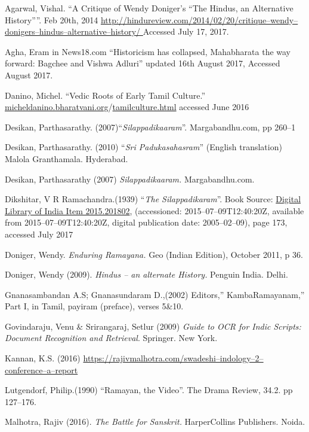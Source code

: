 \begin{thebibliography}{99}
 Agarwal, Vishal. “A Critique of Wendy Doniger’s “The Hindus, an Alternative History””. Feb 20th, 2014 \url{http://hindureview.com/2014/02/20/critique–wendy–donigers–hindus–alternative–history/ } Accessed July 17, 2017.

  Agha, Eram in News18.com “Historicism has collapsed, Mahabharata the way forward: Bagchee and Vishwa Adluri” updated 16th August 2017, Accessed August 2017.

  Danino, Michel. “Vedic Roots of Early Tamil Culture.” \url{micheldanino.bharatvani.org}/\url{tamilculture.html} accessed June 2016

  Desikan, Parthasarathy. (2007)“\textit{Silappadikaaram}”. Margabandhu.com, pp 260–1

  Desikan, Parthasarathy. (2010) “\textit{Sri Padukasahasram}” (English translation) Malola Granthamala. Hyderabad.

  Desikan, Parthasarathy (2007) \textit{Silappadikaaram.} Margabandhu.com.

  Dikshitar, V R Ramachandra.(1939) “\textit{The Silappadikaram}”. Book Source: \url{Digital Library of India Item 2015.201802}, (accessioned: 2015–07–09T12:40:20Z, available from 2015–07–09T12:40:20Z, digital publication date: 2005–02–09), page 173, accessed July 2017

  Doniger, Wendy. \textit{Enduring Ramayana.} Geo (Indian Edition), October 2011, p 36.

  Doniger, Wendy (2009). \textit{Hindus – an alternate History.} Penguin India. Delhi.

  Gnanasambandan A.S; Gnanasundaram D.,(2002) Editors,” KambaRamayanam,” Part I, in Tamil, payiram (preface), verses 5\&10.

  Govindaraju, Venu \& Srirangaraj, Setlur (2009) \textit{Guide to OCR for Indic Scripts:} \textit{Document Recognition and Retrieval}. Springer. New York.

  Kannan, K.S. (2016) \url{https://rajivmalhotra.com/swadeshi–indology–2–conference–a–report}

  Lutgendorf, Philip.(1990) “Ramayan, the Video”. The Drama Review, 34.2. pp 127–176.

  Malhotra, Rajiv (2016). \textit{The Battle for Sanskrit.} HarperCollins Publishers. Noida.


\end{thebibliography}
